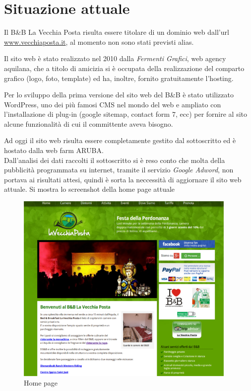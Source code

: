 \documentclass[a4paper,12pt,hidelinks]{report}
\begin{document}
\section{Situazione attuale}
  Il B\&B La Vecchia Posta risulta essere titolare di un dominio web dall'url \url{www.vecchiaposta.it}, al momento non sono stati previsti alias. 
  \par Il sito web è stato realizzato nel 2010 dalla \textit{Fermenti Grafici}, web agency aquilana, che a titolo di amicizia si è occupata della realizzazione
  del comparto grafico (logo, foto, template) ed ha, inoltre, fornito gratuitamente l'hosting.
  \par Per lo sviluppo della prima versione del sito web del B\&B è stato utilizzato WordPress, uno dei più famosi CMS nel mondo del web e ampliato con l'installazione 
  di plug-in (google sitemap, contact form 7, ecc)  per fornire al sito alcune funzionalità di cui il committente aveva bisogno.
  \par Ad oggi il sito web risulta essere completamente gestito dal sottoscritto ed è hostato dalla web farm ARUBA.
  \\Dall'analisi dei dati raccolti il sottoscritto si è reso conto che molta della pubblicità programmata su internet, tramite il servizio \textit{Google Adword}, 
  non portava ai risultati attesi, quindi è sorta la neccessità di aggiornare il sito web attuale.
  Si mostra lo screenshot della home page attuale
  \begin{figure}[h!]%
    \includegraphics[width=0.95\textwidth,keepaspectratio=true]{../img/homepage}
    \centering
    \caption{Home page}%
    \label{fig:googleHomePage}%
  \end{figure}
  
\end{document}
